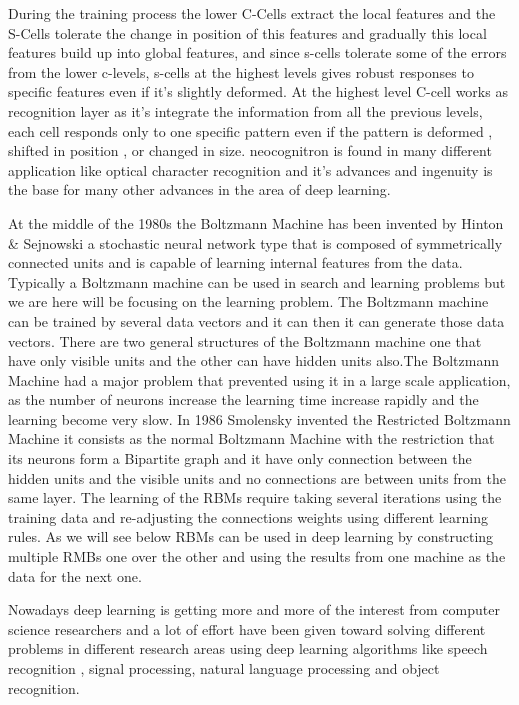 \documentclass[12pt,twoside]{article}
\theoremstyle{plain}
\theoremstyle{definition}
\theoremstyle{remark}
\begin{document}
During the training process the lower C-Cells extract the local features and the S-Cells tolerate the change in position of this features and gradually this local features build up into global features, and since s-cells tolerate some of the errors from the lower c-levels, s-cells at the highest levels gives robust responses to specific features even if it's slightly deformed. At the highest level C-cell works as recognition layer as it's integrate the information from all the previous levels, each cell responds only to one specific pattern even if the pattern is deformed , shifted in position , or changed in size. neocognitron is found in  many different application like optical character recognition and it's advances and ingenuity is the base for many other advances in the area of deep learning.

At the middle of the 1980s the Boltzmann Machine has been invented  by Hinton \& Sejnowski \cite{HintonSejnowski83} \cite{Hinton1986} a stochastic neural network type that is composed of symmetrically connected units and is capable of learning internal features from the data. Typically a Boltzmann machine can be used in search and learning problems but we are here will be focusing on the learning problem. The Boltzmann machine can be trained by several data vectors and it can then it can generate those data vectors. There are two general structures of the Boltzmann machine one that have only visible units and the other can have hidden units also.The Boltzmann Machine had a major problem that prevented using it in a large scale application, as the number of neurons increase the learning time increase rapidly and the 
learning become very slow. In 1986 Smolensky invented the Restricted Boltzmann Machine \cite{Smolensky86} it consists as the normal Boltzmann Machine with the restriction that its neurons form a Bipartite graph and it have only connection between the hidden units and the visible units and no connections are between units from the same layer. The learning of the RBMs require taking several iterations using the training data and re-adjusting the connections weights using different learning rules. As we will see below RBMs can be used in deep learning by constructing multiple RMBs one over the other and using the results from one machine as the data for the next one.

Nowadays deep learning is getting more and more of the interest from computer science researchers and a lot of effort have been given toward solving different problems in different research areas using deep learning algorithms like speech recognition , signal processing, natural language processing and object recognition. 
\end{document}
